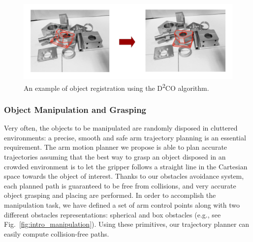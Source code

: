 \documentclass[conference]{IEEEtran}
\begin{document}
\begin{figure}[t!]
\begin{center}
\includegraphics[angle=0,width=\linewidth]{images/d2co_02.png}
\end{center}
\caption{An example of object registration using the D\textsuperscript{2}CO algorithm.}\label{fig:sample_d2co}
\end{figure}

\subsubsection{Object Manipulation and Grasping}\label{sec:manipulation}

Very often, the objects to be manipulated are randomly disposed in cluttered environments: a precise, smooth and safe arm trajectory planning is an essential requirement. The arm motion planner we propose is able to plan accurate trajectories assuming that the best way to grasp an object disposed in an crowded environment is to let the gripper follows a straight line in the Cartesian space towards the object of interest. Thanks to our obstacles avoidance system, each planned path is guaranteed to be free from collisions, and very accurate object grasping and placing are performed. In order to accomplish the manipulation task, we have defined a set of arm control points along with two different obstacles representations: spherical and box obstacles (e.g., see Fig.~\ref{fig:intro_manipulation}). Using these primitives, our trajectory planner can easily compute collision-free paths. 
\end{document}
